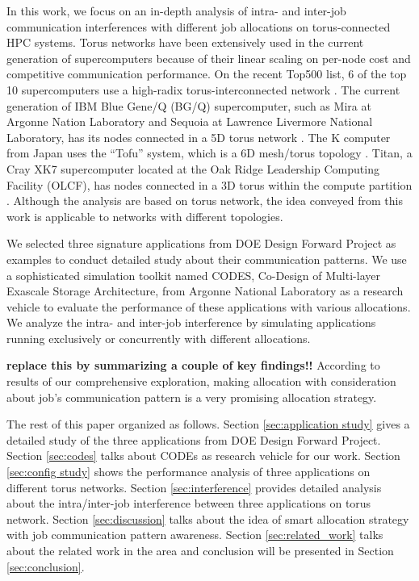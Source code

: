 \documentclass[conference]{IEEEtran}
\begin{document}
In this work, we focus on an in-depth analysis of intra- and inter-job communication interferences with  different job allocations on torus-connected HPC systems. Torus networks have been extensively used in the current generation of supercomputers because of their linear scaling on per-node cost and competitive communication performance. On the recent Top500 list, 6 of the top 10 supercomputers use a high-radix torus-interconnected network \cite{top500}. The current generation of IBM Blue Gene/Q (BG/Q) supercomputer, such as Mira at Argonne Nation Laboratory and Sequoia at  Lawrence Livermore National Laboratory, has its nodes connected in a 5D torus network \cite{bgq}. The K computer from Japan uses the “Tofu” system, which is a 6D mesh/torus topology \cite{tofu}. Titan, a Cray XK7 supercomputer located at the Oak Ridge Leadership Computing Facility (OLCF), has nodes connected in a 3D torus within the compute partition \cite{titan}. Although the analysis are based on torus network, the idea conveyed from this work is applicable to networks with different topologies. 

We selected three signature applications from DOE Design Forward Project\cite{design forward webpage} as examples to conduct detailed study about their communication patterns. We use a sophisticated simulation toolkit named CODES, Co-Design of Multi-layer Exascale Storage Architecture\cite{Jason-2011}, from Argonne National Laboratory as a research vehicle to evaluate the performance of these applications with various allocations. We analyze the intra- and inter-job interference by simulating applications running exclusively or concurrently with different allocations. 

\textbf{replace this by summarizing a couple of key findings!!} According to results of our comprehensive exploration, making allocation with consideration about job's communication pattern is a very promising allocation strategy. 


The rest of this paper organized as follows. Section \ref{sec:application study} gives a detailed study of the three applications from DOE Design Forward Project. Section \ref{sec:codes} talks about CODEs as research vehicle for our work. Section \ref{sec:config study} shows the performance analysis of three applications on different torus networks. Section \ref{sec:interference} provides detailed analysis about the intra/inter-job interference between three applications on torus network. Section \ref{sec:discussion} talks about the idea of smart allocation strategy with job communication pattern awareness. Section \ref{sec:related_work} talks about the related work in the area and conclusion will be presented in Section \ref{sec:conclusion}. 
\end{document}
